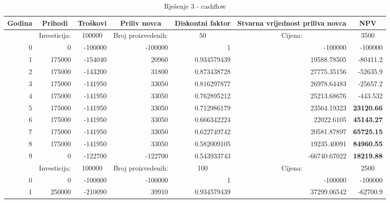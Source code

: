 \documentclass[12pt]{article}
\begin{document}
\begin{landscape}
\begin{table}[htbp]
  \centering
  \caption{Rješenje 3 - cashflow}
    \begin{tabular}{rrrrrrr}
    \toprule
    \multicolumn{1}{c}{Godina} & \multicolumn{1}{c}{Prihodi} & \multicolumn{1}{c}{Troškovi} & \multicolumn{1}{c}{Priliv novca} & \multicolumn{1}{c}{Diskontni faktor} & \multicolumn{1}{p{8.145em}}{Stvarna vrijednost \newline{}priliva novca} & \multicolumn{1}{c}{NPV} \\
    \midrule
          & \multicolumn{1}{c}{Investicija:} & \multicolumn{1}{c}{100000} & \multicolumn{1}{c}{Broj proizvedenih:} & \multicolumn{1}{c}{50} & \multicolumn{1}{c}{Cijena:} & \multicolumn{1}{c}{3500} \\
    \midrule
0     & 0     & -100000 & -100000 & 1     & -100000 & -100000 \\
    1     & 175000 & -154040 & 20960 & 0.934579439 & 19588.78505 & -80411.2 \\
    2     & 175000 & -143200 & 31800 & 0.873438728 & 27775.35156 & -52635.9 \\
    3     & 175000 & -141950 & 33050 & 0.816297877 & 26978.64483 & -25657.2 \\
    4     & 175000 & -141950 & 33050 & 0.762895212 & 25213.68676 & -443.532 \\
    5     & 175000 & -141950 & 33050 & 0.712986179 & 23564.19323 & \textbf{23120.66} \\
    6     & 175000 & -141950 & 33050 & 0.666342224 & 22022.6105 & \textbf{45143.27} \\
    7     & 175000 & -141950 & 33050 & 0.622749742 & 20581.87897 & \textbf{65725.15} \\
    8     & 175000 & -141950 & 33050 & 0.582009105 & 19235.40091 & \textbf{84960.55} \\
    \midrule
    9     & 0     & -122700 & -122700 & 0.543933743 & -66740.67022 & \textbf{18219.88} \\
    \midrule
          & \multicolumn{1}{c}{Investicija:} & \multicolumn{1}{c}{100000} & \multicolumn{1}{c}{Broj proizvedenih:} & \multicolumn{1}{c}{100} & \multicolumn{1}{c}{Cijena:} & \multicolumn{1}{c}{2500} \\
    \midrule
    0     & 0     & -100000 & -100000 & 1     & -100000 & -100000 \\
    1     & 250000 & -210090 & 39910 & 0.934579439 & 37299.06542 & -62700.9 \\

\end{tabular}
\end{table}
\end{landscape}
\end{document}
